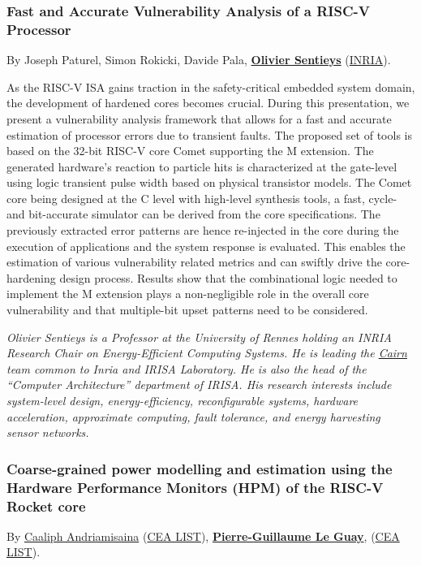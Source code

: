 \documentclass[a4paper, 10pt]{article}
\begin{document}
{\subsubsection{Fast and Accurate Vulnerability Analysis of a RISC-V Processor}
\label{sec:orgc2ba8cf}
By Joseph Paturel, Simon Rokicki, Davide Pala,
\textbf{\href{http://people.rennes.inria.fr/Olivier.Sentieys/}{Olivier Sentieys}}
(\href{https://www.inria.fr}{INRIA}).

As the RISC-V ISA gains traction in the safety-critical embedded system
domain, the development of hardened cores becomes crucial. During this
presentation, we present a vulnerability analysis framework that allows
for a fast and accurate estimation of processor errors due to transient
faults. The proposed set of tools is based on the 32-bit RISC-V core
Comet supporting the M extension. The generated hardware's reaction to
particle hits is characterized at the gate-level using logic transient
pulse width based on physical transistor models. The Comet core being
designed at the C level with high-level synthesis tools, a fast, cycle-
and bit-accurate simulator can be derived from the core specifications.
The previously extracted error patterns are hence re-injected in the
core during the execution of applications and the system response is
evaluated. This enables the estimation of various vulnerability related
metrics and can swiftly drive the core-hardening design process. Results
show that the combinational logic needed to implement the M extension
plays a non-negligible role in the overall core vulnerability and that
multiple-bit upset patterns need to be considered.

\emph{\footnotesize Olivier Sentieys is a Professor at the University of Rennes holding an INRIA Research Chair on Energy-Efficient Computing Systems. He is leading the \href{https://team.inria.fr/cairn/}{Cairn} team common to Inria and IRISA Laboratory. He is also the head of the “Computer Architecture” department of IRISA. His research interests include system-level design, energy-efficiency, reconfigurable systems, hardware acceleration, approximate computing, fault tolerance, and energy harvesting sensor networks.}

\subsubsection{Coarse-grained power modelling and estimation using the Hardware Performance Monitors (HPM) of the RISC-V Rocket core}
\label{sec:orgf2630f5}
By \href{mailto:caaliph.andriamisaina@cea.fr}{Caaliph Andriamisaina}
(\href{http://www-list.cea.fr}{CEA LIST}),
\textbf{\href{../pages/pierre-guillaume.leguay@cea.fr}{Pierre-Guillaume Le Guay}},
(\href{http://www-list.cea.fr}{CEA LIST}).

}
\end{document}
